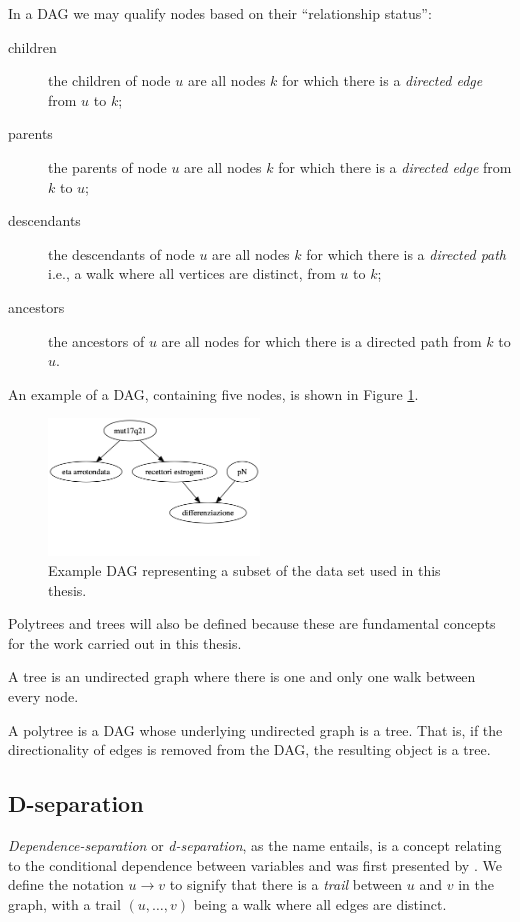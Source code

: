 In a DAG we may qualify nodes based on their \enquote{relationship status}:
\begin{description}
	\item[children] the children of node $u$ are all nodes $k$ for which there is a \textit{directed edge} from $u$ to $k$;
	\item[parents] the parents of node $u$ are all nodes $k$ for which there is a \textit{directed edge} from $k$ to $u$;
	\item[descendants] the descendants of node $u$ are all nodes $k$ for which there is a \textit{directed path} i.e., a walk where all vertices are distinct, from $u$ to $k$;
	\item[ancestors] the ancestors of $u$ are all nodes for which there is a directed path from $k$ to $u$.
\end{description}
An example of a DAG, containing five nodes, is shown in Figure \ref{fig:bn-example-dag}.

\begin{figure}[htbp]
\centerline{\includegraphics[width=0.5\textwidth]{mathematical-background/images/bn-example-structure}}
\caption{Example DAG representing a subset of the data set used in this thesis.}
\label{fig:bn-example-dag}
\end{figure}

Polytrees and trees will also be defined because these are fundamental concepts for the work carried out in this thesis.
\begin{definition}[Tree] \label{def:tree}
	A tree is an undirected graph where there is one and only one walk between every node.	
\end{definition}
\begin{definition}[Polytree] \label{def:polytree}
	A polytree is a DAG whose underlying undirected graph is a tree.
	That is, if the directionality of edges is removed from the DAG, the resulting object is a tree. 
\end{definition}

\subsection{D-separation} \label{subsec:d-separation}
\textit{Dependence-separation} or \textit{d-separation}, as the name entails, is a concept relating to the conditional dependence between variables and was first presented by \citet{Pearl1988}.
We define the notation $u \rightarrow v$ to signify that there is a \textit{trail} between $u$ and $v$ in the graph, with a trail $(u, \ldots ,v)$ being a walk where all edges are distinct.

